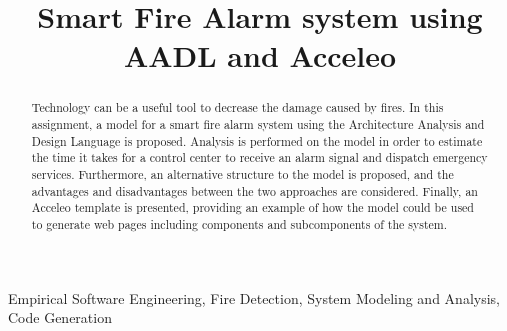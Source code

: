 \documentclass[10pt, conference, compsocconf]{IEEEtran}
\begin{document}
\title{
	Smart Fire Alarm system using AADL and Acceleo
}

\author{
\and
{}
}

\maketitle

\begin{abstract}
Technology can be a useful tool to decrease the damage caused by fires. In this assignment, a model for a smart fire alarm system using the Architecture Analysis and Design Language is proposed. Analysis is performed on the model in order to estimate the time it takes for a control center to receive an alarm signal and dispatch emergency services. Furthermore, an alternative structure to the model is proposed, and the advantages and disadvantages between the two approaches are considered. Finally, an Acceleo template is presented, providing an example of how the model could be used to generate web pages including components and subcomponents of the system.
\end{abstract}

\begin{IEEEkeywords}
Empirical Software Engineering, Fire Detection, System Modeling and Analysis, Code Generation
\end{IEEEkeywords}





 



\end{document}
